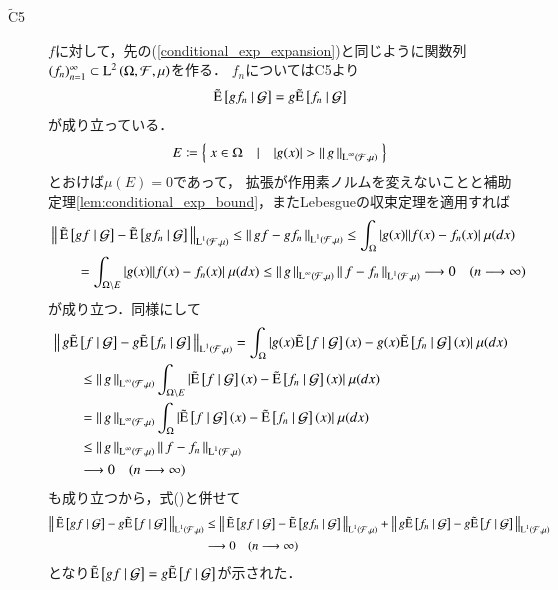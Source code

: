 \begin{prf}
\begin{description}
			\item[$\tilde{\mathrm{C}}$5]
				$f$に対して，先の(\ref{conditional_exp_expansion})と同じように関数列$(f_n)_{n=1}^{\infty} \subset \operatorname{L}^{2} \left(\Omega,\mathcal{F},\mu\right)$を作る．
				$f_n$についてはC5より
				\begin{align}
					\tilde{\operatorname{E}} \left[ gf_n \ \middle|\ \mathcal{G} \right] = g\tilde{\operatorname{E}} \left[ f_n \ \middle|\ \mathcal{G} \right] \label{eq:conditional_exp_L1}
				\end{align}
				が成り立っている．
				\begin{align}
					E \coloneqq \left\{\ x \in \Omega\quad |\quad |g(x)| > \left\|\, g\, \right\|_{\operatorname{L}^{\infty} \left(\mathcal{F},\mu\right)}\ \right\}
				\end{align}
				とおけば$\mu(E) = 0$であって，
				拡張が作用素ノルムを変えないことと補助定理\ref{lem:conditional_exp_bound}，またLebesgueの収束定理を適用すれば
				\begin{align}
					&\left\|\, \tilde{\operatorname{E}} \left[ gf \ \middle|\ \mathcal{G} \right] - \tilde{\operatorname{E}} \left[ gf_n \ \middle|\ \mathcal{G} \right]\, \right\|_{\operatorname{L}^{1} \left(\mathcal{F},\mu\right)}
					\leq \left\|\, gf - gf_n\, \right\|_{\operatorname{L}^{1} \left(\mathcal{F},\mu\right)} 
					\leq \int_\Omega |g(x)||f(x) - f_n(x)|\ \mu(dx) \\
					&\qquad = \int_{\Omega \backslash E} |g(x)||f(x) - f_n(x)|\ \mu(dx) \leq \left\|\, g\, \right\|_{\operatorname{L}^{\infty} \left(\mathcal{F},\mu\right)}\left\|\, f - f_n\, \right\|_{\operatorname{L}^{1} \left(\mathcal{F},\mu\right)}
					\longrightarrow 0 \quad (n \longrightarrow \infty)
				\end{align}
				が成り立つ．同様にして
				\begin{align}
					&\Norm{g\tcexp{f}{\mathcal{G}} - g\tcexp{f_n}{\mathcal{G}}}{\Lp{1}{\mathcal{F},\mu}}
					= \int_\Omega |g(x)\tcexp{f}{\mathcal{G}}(x) - g(x)\tcexp{f_n}{\mathcal{G}}(x)|\ \mu(dx) \\
					&\qquad \leq \Norm{g}{\Lp{\infty}{\mathcal{F},\mu}} \int_{\Omega \backslash E} |\tcexp{f}{\mathcal{G}}(x) - \tcexp{f_n}{\mathcal{G}}(x)|\ \mu(dx) \\
					&\qquad= \Norm{g}{\Lp{\infty}{\mathcal{F},\mu}} \int_{\Omega} |\tcexp{f}{\mathcal{G}}(x) - \tcexp{f_n}{\mathcal{G}}(x)|\ \mu(dx) \\
					&\qquad\leq \Norm{g}{\Lp{\infty}{\mathcal{F},\mu}}\Norm{f - f_n}{\Lp{1}{\mathcal{F},\mu}} \\
					&\qquad \longrightarrow 0 \quad (n \longrightarrow \infty)
				\end{align}
				も成り立つから，式()と併せて
				\begin{align}
					\left\|\, \tilde{\operatorname{E}} \left[ gf \ \middle|\ \mathcal{G} \right] - g\tilde{\operatorname{E}} \left[ f \ \middle|\ \mathcal{G} \right]\, \right\|_{\operatorname{L}^{1} \left(\mathcal{F},\mu\right)}
					&\leq \left\|\, \tilde{\operatorname{E}} \left[ gf \ \middle|\ \mathcal{G} \right] - \tilde{\operatorname{E}} \left[ gf_n \ \middle|\ \mathcal{G} \right]\, \right\|_{\operatorname{L}^{1} \left(\mathcal{F},\mu\right)}
						+ \left\|\, g\tilde{\operatorname{E}} \left[ f_n \ \middle|\ \mathcal{G} \right] - g\tilde{\operatorname{E}} \left[ f \ \middle|\ \mathcal{G} \right]\, \right\|_{\operatorname{L}^{1} \left(\mathcal{F},\mu\right)} \\
					&\longrightarrow 0 \quad (n \longrightarrow \infty)
				\end{align}
				となり$\tilde{\operatorname{E}} \left[ gf \ \middle|\ \mathcal{G} \right] = g\tilde{\operatorname{E}} \left[ f \ \middle|\ \mathcal{G} \right]$が示された．
			

\end{description}
\end{prf}
